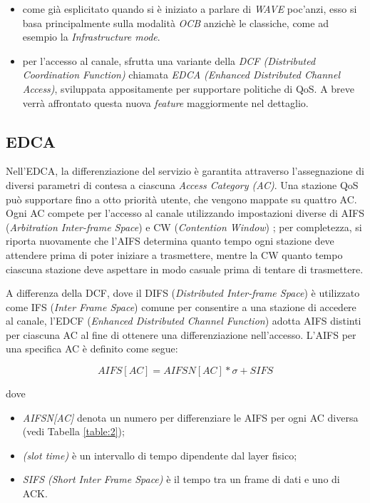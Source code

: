 \begin{itemize}
    \item come già esplicitato quando si è iniziato a parlare di \textit{WAVE} poc'anzi, esso si basa principalmente sulla modalità \textit{OCB} anzichè le classiche, come ad esempio la \textit{Infrastructure mode}.
    \item per l'accesso al canale, sfrutta una variante della \textit{DCF (Distributed Coordination Function)} chiamata \textit{EDCA (Enhanced Distributed Channel Access)}, sviluppata appositamente per supportare politiche di QoS. A breve verrà affrontato questa nuova \textit{feature} maggiormente nel dettaglio.
\end{itemize}

\subsection[EDCA]{EDCA}
\label{edca}
Nell'EDCA, la differenziazione del servizio è garantita attraverso l'assegnazione di diversi parametri di contesa a ciascuna \textit{Access Category (AC)}. Una stazione QoS può supportare fino a otto priorità utente, che vengono mappate su quattro AC. Ogni AC compete per l'accesso al canale utilizzando impostazioni diverse di AIFS (\textit{Arbitration Inter-frame Space}) e CW (\textit{Contention Window}) \cite{4024121}; per completezza, si riporta nuovamente che l'AIFS determina quanto tempo ogni stazione deve attendere prima di poter iniziare a trasmettere, mentre la CW quanto tempo ciascuna stazione deve aspettare in modo casuale prima di tentare di trasmettere.

A differenza della DCF, dove il DIFS (\textit{Distributed Inter-frame Space}) è utilizzato come IFS (\textit{Inter Frame Space}) comune per consentire a una stazione di accedere al canale, l'EDCF (\textit{Enhanced Distributed Channel Function}) adotta AIFS distinti per ciascuna AC al fine di ottenere una differenziazione nell'accesso. L'AIFS per una specifica AC è definito come segue:

\[AIFS[AC] = AIFSN[AC] * \sigma + SIFS\]

\noindent dove
\begin{itemize}
    \item \textit{AIFSN[AC]} denota un numero per differenziare le AIFS per ogni AC diversa (vedi Tabella \ref{table:2});
    \item \textit{\textsigma} \textit{(slot time)} è un intervallo di tempo dipendente dal layer fisico;
    \item \textit{SIFS (\textit{Short Inter Frame Space})} è il tempo tra un frame di dati e uno di ACK.
\end{itemize}

